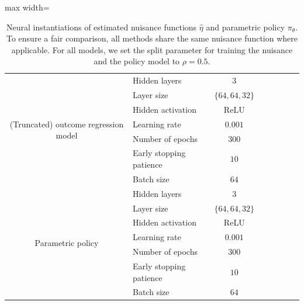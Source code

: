 \documentclass{article} %
\theoremstyle{plain}
\theoremstyle{definition}
\theoremstyle{remark}
\newcommand{\cmark}{\textcolor{ForestGreen}{\ding{51}}}
\newcommand{\xmark}{\textcolor{BrickRed}{\ding{55}}}
\begin{document}
\begin{table}[h!]
\begin{adjustbox}{max width=\textwidth}
\begin{tabular}{c|l|c|c|c|c|c|c}
    \multirow{7}{*}{(Truncated) outcome regression model} & Hidden layers 
        & 3  &  &  & 
        &  &  \\ %
    & Layer size
        & $\{64,64, 32\}$ & & & & & \\ %
    & Hidden activation
        & ReLU &   &   &  &   &  \\ %
    & Learning rate 
        & $0.001$ & \xmark & \cmark & \xmark & \cmark & \cmark \\ %
    & Number of epochs
        & $300$ &   &   &  &   &  \\ %
    & Early stopping patience
        & $10$ &   &   &  &   &  \\ %
    & Batch size
        & $64$ &   &   &  &   &  \\ %
        \midrule

\multirow{7}{*}{Parametric policy} & Hidden layers 
        & 3  &  &  & 
        &  &  \\ %
    & Layer size
        & $\{64,64, 32\}$ & & & & & \\ %
    & Hidden activation
        & ReLU &   &   &  &   &  \\ %
    & Learning rate 
        & $0.001$ & \cmark & \cmark & \cmark & \cmark & \cmark \\ %
    & Number of epochs
        & $300$ &   &   &  &   &  \\ %
    & Early stopping patience
        & $10$ &   &   &  &   &  \\ %
    & Batch size
        & $64$ &   &   &  &   &  \\ %
    
        \bottomrule
    \end{tabular}
    \end{adjustbox}

    \caption{Neural instantiations of estimated nuisance functions $\hat{\eta}$ and parametric policy $\pi_\theta$. To ensure a fair comparison, all methods share the same nuisance function where applicable. For all models, we set the split parameter for training the nuisance and the policy model to $\rho=0.5$.}

    \label{tab:implementation_details}
\end{table}







\end{document}
